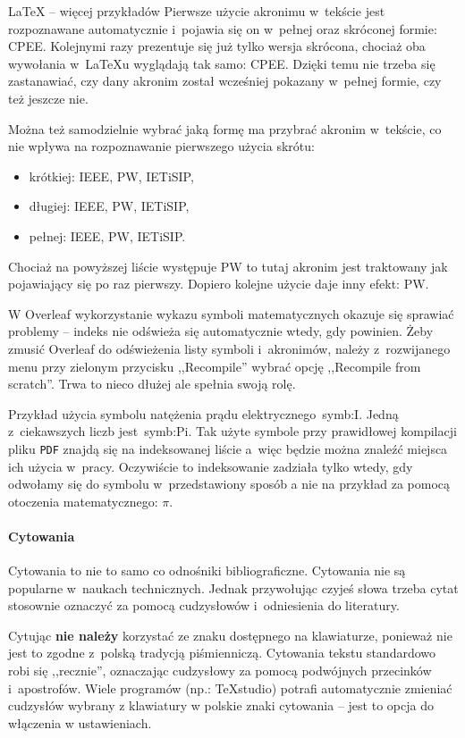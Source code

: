 \begin{easyappendix}{\LaTeX{} -- więcej przykładów}
Pierwsze użycie akronimu w~tekście jest rozpoznawane automatycznie i~pojawia się on w~pełnej oraz skróconej formie: \gls{CPEE}. Kolejnymi razy prezentuje się już tylko wersja skrócona, chociaż oba wywołania w~\LaTeX{u} wyglądają tak samo: \gls{CPEE}. Dzięki temu nie trzeba się zastanawiać, czy dany akronim został wcześniej pokazany w~pełnej formie, czy też jeszcze nie.

Można też samodzielnie wybrać jaką formę ma przybrać akronim w~tekście, co nie wpływa na rozpoznawanie pierwszego użycia skrótu:
\begin{itemize}
	\item krótkiej: \acrshort{IEEE}, \acrshort{PW}, \acrshort{IETiSIP},
	\item długiej: \acrlong{IEEE}, \acrlong{PW}, \acrlong{IETiSIP},
	\item pełnej: \acrfull{IEEE}, \acrfull{PW}, \acrfull{IETiSIP}.
\end{itemize}

Chociaż na powyższej liście występuje \gls{PW} to tutaj akronim jest traktowany jak pojawiający się po raz pierwszy. Dopiero kolejne użycie daje inny efekt: \gls{PW}.

W Overleaf wykorzystanie wykazu symboli matematycznych okazuje się sprawiać problemy -- indeks nie odświeża się automatycznie wtedy, gdy powinien. Żeby zmusić Overleaf do odświeżenia listy symboli i~akronimów, należy z~rozwijanego menu przy zielonym przycisku ,,Recompile'' wybrać opcję ,,Recompile from scratch''. Trwa to nieco dłużej ale spełnia swoją rolę.

Przykład użycia symbolu natężenia prądu elektrycznego~\gls{symb:I}. Jedną z~ciekawszych liczb jest~\gls{symb:Pi}. Tak użyte symbole przy prawidłowej kompilacji pliku \texttt{PDF} znajdą się na indeksowanej liście a~więc będzie można znaleźć miejsca ich użycia w~pracy. Oczywiście to indeksowanie zadziała tylko wtedy, gdy odwołamy się do symbolu w~przedstawiony sposób a nie na przykład za pomocą otoczenia matematycznego: $\pi$.

\paragraph{Cytowania}
Cytowania to nie to samo co odnośniki bibliograficzne. Cytowania nie są popularne w~naukach technicznych. Jednak przywołując czyjeś słowa trzeba cytat stosownie oznaczyć za pomocą cudzysłowów i~odniesienia do literatury.

Cytując \textbf{nie należy} korzystać ze znaku  dostępnego na klawiaturze, ponieważ nie jest to zgodne z~polską tradycją piśmienniczą. Cytowania tekstu standardowo robi się ,,recznie'', oznaczając cudzysłowy za pomocą podwójnych przecinków i~apostrofów. Wiele programów (np.: TeXstudio) potrafi automatycznie zmieniać cudzysłów wybrany z klawiatury w polskie znaki cytowania -- jest to opcja do włączenia w ustawieniach.


\end{easyappendix}
